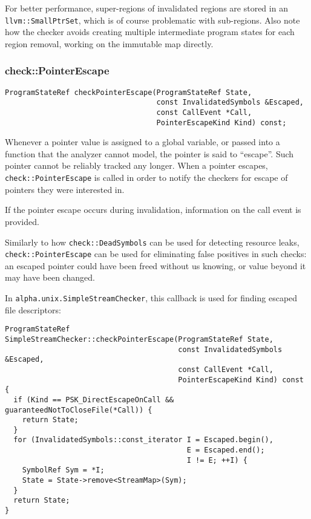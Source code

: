 \documentclass[a4paper,12pt]{article}
\newenvironment{nobr}{\begin{minipage}{\textwidth}\setlength\parskip{1em}
}{\end{minipage}\ignorespacesafterend}
\begin{document}
For better performance, super-regions of invalidated regions are stored in an \lstinline|llvm::SmallPtrSet|, which is of course problematic with sub-regions. Also note how the checker avoids creating multiple intermediate program states for each region removal, working on the immutable map directly.


\begin{nobr}
\subsubsection{check::PointerEscape}

\begin{lstlisting}[style=cplusplus,numbers=none]
ProgramStateRef checkPointerEscape(ProgramStateRef State,
                                   const InvalidatedSymbols &Escaped,
                                   const CallEvent *Call,
                                   PointerEscapeKind Kind) const;
\end{lstlisting}

Whenever a pointer value is assigned to a global variable, or passed into a function that the analyzer cannot model, the pointer is said to ``escape''. Such pointer cannot be reliably tracked any longer. When a pointer escapes, \lstinline|check::PointerEscape| is called in order to notify the checkers for escape of pointers they were interested in.
\end{nobr}

If the pointer escape occurs during invalidation, information on the call event is provided.

Similarly to how \lstinline|check::DeadSymbols| can be used for detecting resource leaks, \lstinline|check::PointerEscape| can be used for eliminating false positives in such checks: an escaped pointer could have been freed without us knowing, or value beyond it may have been changed.

In \lstinline|alpha.unix.SimpleStreamChecker|, this callback is used for finding escaped file descriptors:

\begin{lstlisting}[style=cplusplus]
ProgramStateRef
SimpleStreamChecker::checkPointerEscape(ProgramStateRef State,
                                        const InvalidatedSymbols &Escaped,
                                        const CallEvent *Call,
                                        PointerEscapeKind Kind) const {
  if (Kind == PSK_DirectEscapeOnCall && guaranteedNotToCloseFile(*Call)) {
    return State;
  }
  for (InvalidatedSymbols::const_iterator I = Escaped.begin(),
                                          E = Escaped.end();
                                          I != E; ++I) {
    SymbolRef Sym = *I;
    State = State->remove<StreamMap>(Sym);
  }
  return State;
}
\end{lstlisting}
\end{document}
